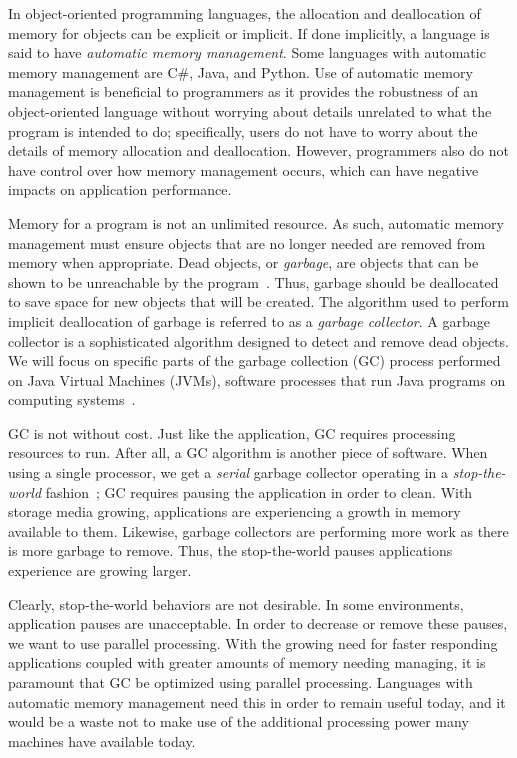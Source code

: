 \documentclass{sig-alternate}
\begin{document}
In object-oriented programming languages, the allocation and deallocation
of memory for objects can be explicit or implicit. If done implicitly,
a language is said to have \emph{automatic memory management}. Some languages 
with automatic memory management are C\#, Java, and Python.
Use of automatic memory management is beneficial to programmers as it provides
the robustness of an object-oriented language without worrying about
details unrelated to what the program is intended to do; specifically, users do
not have to worry about the details of memory allocation and deallocation. 
However, programmers also do not have control over how memory management occurs,
which can have negative impacts on application performance.

Memory for a program is not an unlimited resource. As such, automatic memory management
must ensure objects that are no longer needed are removed from memory
when appropriate. Dead objects, or \emph{garbage}, are objects that can be shown
to be unreachable by the program~\cite{glossary:g}. Thus, garbage should be deallocated to 
save space for new objects that will be created. The algorithm used to perform implicit
deallocation of garbage is referred to as a \emph{garbage collector}.
A garbage collector is a sophisticated algorithm designed to detect
and remove dead objects. We will focus on specific parts of the 
garbage collection (GC) process performed on Java Virtual Machines 
(JVMs), software processes that run Java programs on computing systems~\cite{Lindblom:2011}.

GC is not without cost.
Just like the application, GC requires processing resources to run. After all,
a GC algorithm is another piece of software. When using a single processor, 
we get a \emph{serial} garbage collector operating in a 
\emph{stop-the-world} fashion~\cite{Lindblom:2011}; GC requires
pausing the application in order to clean. With storage media growing, 
applications are experiencing a growth in memory
available to them. Likewise, garbage collectors are performing more
work as there is more garbage to remove. Thus, the stop-the-world
pauses applications experience are growing larger.

Clearly, stop-the-world behaviors are not desirable. In some environments,
application pauses are unacceptable. In order to decrease or remove these 
pauses, we want to use parallel processing. With the growing
need for faster responding applications coupled with greater amounts of memory needing managing,
it is paramount that GC be optimized using parallel processing. Languages with
automatic memory management need this in order to remain useful today,
and it would be a waste not to make use of the additional processing power
many machines have available today.
\end{document}
